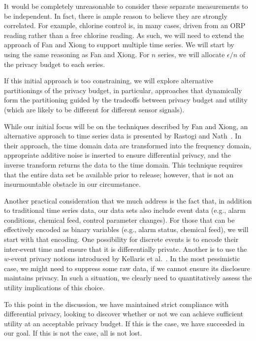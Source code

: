 It would be completely unreasonable to consider these separate measurements
to be independent.  In fact, there is ample reason to believe they are
strongly correlated.  For example, chlorine control is, in many cases,
driven from an ORP reading rather than a free chlorine reading.
As such, we will need to extend the approach of Fan and Xiong to support
multiple time series.
We will start by using the same reasoning as Fan and Xiong.  For $n$
series, we will allocate $\epsilon / n$ of the privacy budget to each series.

If this initial approach is too constraining, we will explore alternative
partitionings of the privacy budget, in particular, approaches that dynamically
form the partitioning guided by the tradeoffs between privacy budget
and utility (which are likely to be different for different sensor signals).

While our initial focus will be on the techniques described by Fan and Xiong,
an alternative approach to time series data is presented by Rastogi
and Nath~\cite{rn10}.  In their approach, the time domain data are
transformed into the frequency domain, appropriate additive noise
is inserted to ensure differential privacy, and the inverse transform
returns the data to the time domain.
This technique requires that the entire data set be available prior to
release; however, that is not an insurmountable obstacle in our
circumstance.

Another practical consideration that we much address is the fact that, in
addition to traditional time series data, our data sets also include
event data (e.g., alarm conditions, chemical feed, control parameter
changes).  For those that can be effectively encoded as binary variables
(e.g., alarm status, chemical feed), we will start with that encoding.
One possibility for discrete events is to encode their inter-event time
and ensure that it is differentially private.
Another is to use the $w$-event privacy notions introduced by
Kellaris et al.~\cite{Kellaris14}.
In the most pessimistic case, we might need to suppress some raw data,
if we cannot ensure its disclosure maintains privacy.  In such a situation,
we clearly need to quantitatively assess the utility implications
of this choice.

To this point in the discussion, we have maintained strict compliance
with differential privacy, looking to discover whether or not we can
achieve sufficient utility at an acceptable privacy budget.  If this is
the case, we have succeeded in our goal.  If this is not the case, all
is not lost.

